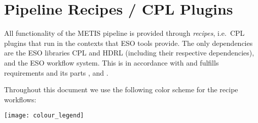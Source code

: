 \clearpage

\section{Pipeline Recipes / CPL Plugins}
\label{sec:pipeline_recipes}

All functionality of the METIS pipeline is provided through \emph{recipes}, i.e.~CPL plugins that run in the contexts that ESO tools provide. The only dependencies are the ESO libraries CPL and HDRL (including their respective dependencies), and the ESO workflow system. This is in accordance with \cite{1618} and fulfills requirements  and its parts ,  and .

Throughout this document we use the following color scheme for the
recipe workflows:
\begin{center}
  \texttt{[image: colour\_legend]}
\end{center}










